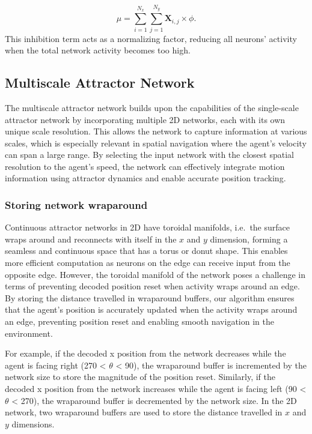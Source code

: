 \begin{equation}
\mu=\sum_{i=1}^{N_x} \sum_{j=1}^{N_y} \mathbf{X}_{i,j}\times \phi.
\end{equation}
This inhibition term acts as a normalizing factor, reducing all neurons' activity when the total network activity becomes too high.


\subsection{Multiscale Attractor Network}
\label{subsec:multiscalenetwork}

The multiscale attractor network builds upon the capabilities of the single-scale attractor network by incorporating multiple 2D networks, each with its own unique scale resolution. This allows the network to capture information at various scales, which is especially relevant in spatial navigation where the agent's velocity can span a large range. By selecting the input network with the closest spatial resolution to the agent's speed, the network can effectively integrate motion information using attractor dynamics and enable accurate position tracking.



\subsubsection{\textbf{Storing network wraparound}}
 Continuous attractor networks in 2D have toroidal manifolds, i.e.~the surface wraps around and reconnects with itself in the $x$ and $y$ dimension, forming a seamless and continuous space that has a torus or donut shape. This enables more efficient computation as neurons on the edge can receive input from the opposite edge. However, the toroidal manifold of the network poses a challenge in terms of preventing decoded position reset when activity wraps around an edge. By storing the distance travelled in wraparound buffers, our algorithm ensures that the agent's position is accurately updated when the activity wraps around an edge, preventing position reset and enabling smooth navigation in the environment. 
 
 For example, if the decoded x position from the network decreases while the agent is facing right (270 < $\theta$ < 90), the wraparound buffer is incremented by the network size to store the magnitude of the position reset. Similarly, if the decoded x position from the network increases while the agent is facing left (90 < $\theta$ < 270), the wraparound buffer is decremented by the network size. In the 2D network, two wraparound buffers are used to store the distance travelled in $x$ and $y$ dimensions. 
 

